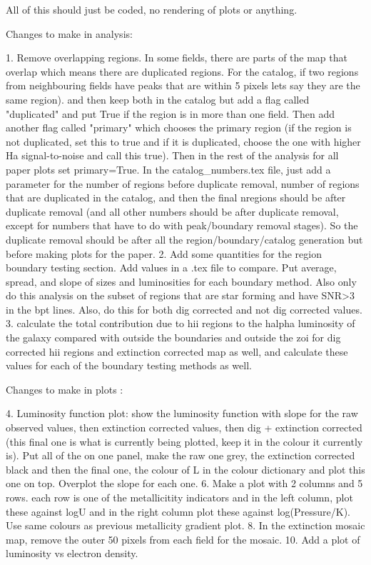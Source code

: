 All of this should just be coded, no rendering of plots or anything.

Changes to make in analysis:

1. Remove overlapping regions. In some fields, there are parts of the map that overlap which means there are duplicated regions. For the catalog, if two regions from neighbouring fields have peaks that are within 5 pixels lets say they are the same region). and then keep both in the catalog but add a flag called "duplicated" and put True if the region is in more than one field. Then add another flag called "primary" which chooses the primary region (if the region is not duplicated, set this to true and if it is duplicated, choose the one with higher Ha signal-to-noise and call this true). Then in the rest of the analysis for all paper plots set primary=True. In the catalog_numbers.tex file, just add a parameter for the number of regions before duplicate removal, number of regions that are duplicated in the catalog, and then the final nregions should be after duplicate removal (and all other numbers should be after duplicate removal, except for numbers that have to do with peak/boundary removal stages). So the duplicate removal should be after all the region/boundary/catalog generation but before making plots for the paper.
2. Add some quantities for the region boundary testing section. Add values in a .tex file to compare. Put average, spread, and slope of sizes and luminosities for each boundary method. Also only do this analysis on the subset of regions that are star forming and have SNR>3 in the bpt lines. Also, do this for both dig corrected and not dig corrected values.
3. calculate the total contribution due to hii regions to the halpha luminosity of the galaxy compared with outside the boundaries and outside the zoi for dig corrected hii regions and extinction corrected map as well, and calculate these values for each of the boundary testing methods as well.

Changes to make in plots :

4. Luminosity function plot: show the luminosity function with slope for the raw observed values, then extinction corrected values, then dig + extinction  corrected (this final one is what is currently being plotted, keep it in the colour it currently is). Put all of the on one panel, make the raw one grey, the extinction corrected black and then the final one, the colour of L in the colour dictionary and plot this one on top. Overplot the slope for each one.
6. Make a plot with 2 columns and 5 rows. each row is one of the metallicitity indicators and in the left column, plot these against logU and in the right column plot these against log(Pressure/K). Use same colours as previous metallicity gradient plot.
8. In the extinction mosaic map, remove the outer 50 pixels from each field for the mosaic.
10. Add a plot of luminosity vs electron density.